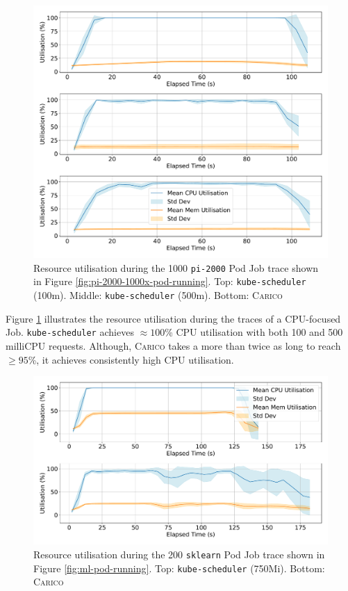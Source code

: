 \begin{figure}[h]
    \centering
    \includegraphics[width=\textwidth]{images/pi-util.pdf}
    \caption{Resource utilisation during the 1000 \texttt{pi-2000} Pod
    Job trace shown in Figure \ref{fig:pi-2000-1000x-pod-running}. Top:
    \texttt{kube-scheduler} (100m). Middle: \texttt{kube-scheduler} (500m).
    Bottom: \textsc{Carico}}
    \label{fig:pi-2000-1000x-pod-util}
\end{figure}

Figure \ref{fig:pi-2000-1000x-pod-util} illustrates the resource utilisation
during the traces of a CPU-focused Job. \texttt{kube-scheduler} achieves
$\approx100$\% CPU utilisation with both 100 and 500 milliCPU requests.
Although, \textsc{Carico} takes a more than twice as long to reach $\geq 95$\%,
it achieves consistently high CPU utilisation.

\begin{figure}[ht!]
    \centering
    \includegraphics[width=\textwidth]{images/ml-util.pdf}
    \caption{Resource utilisation during the 200 \texttt{sklearn} Pod
    Job trace shown in Figure \ref{fig:ml-pod-running}. Top:
    \texttt{kube-scheduler} (750Mi). Bottom: \textsc{Carico}}
    \label{fig:ml-util}
\end{figure}

